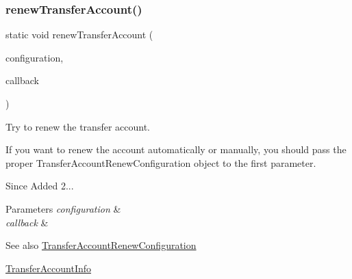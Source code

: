 \subsubsection{\texorpdfstring{renew\+Transfer\+Account()}{renewTransferAccount()}}
{\footnotesize\ttfamily static void renew\+Transfer\+Account (\begin{DoxyParamCaption}\item[{final \hyperlink{classcom_1_1toast_1_1android_1_1gamebase_1_1auth_1_1transfer_1_1data_1_1_transfer_account_renew_configuration}{Transfer\+Account\+Renew\+Configuration}}]{configuration,  }\item[{final \hyperlink{interfacecom_1_1toast_1_1android_1_1gamebase_1_1_gamebase_data_callback}{Gamebase\+Data\+Callback}$<$ \hyperlink{classcom_1_1toast_1_1android_1_1gamebase_1_1auth_1_1transfer_1_1data_1_1_transfer_account_info}{Transfer\+Account\+Info} $>$}]{callback }\end{DoxyParamCaption})\hspace{0.3cm}{\ttfamily [static]}}



Try to renew the transfer account. 

If you want to renew the account automatically or manually, you should pass the proper Transfer\+Account\+Renew\+Configuration object to the first parameter.

\begin{DoxySince}{Since}
Added 2... 
\end{DoxySince}

\begin{DoxyParams}{Parameters}
{\em configuration} & \\
\hline
{\em callback} & \\
\hline
\end{DoxyParams}
\begin{DoxySeeAlso}{See also}
\hyperlink{}{Transfer\+Account\+Renew\+Configuration} 

\hyperlink{}{Transfer\+Account\+Info}
\end{DoxySeeAlso}

